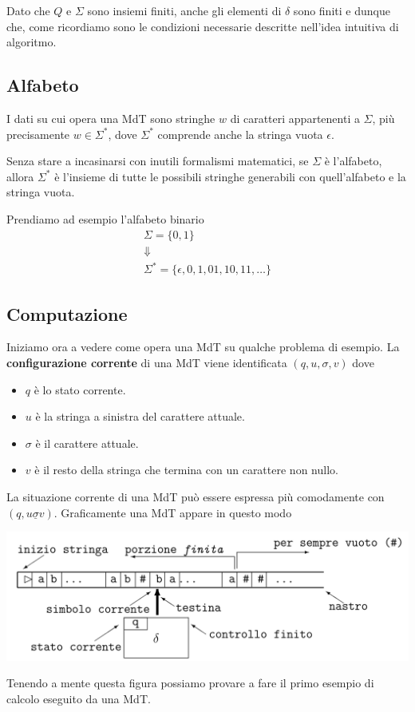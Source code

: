 Dato che $Q$ e $\Sigma$ sono insiemi finiti, anche gli elementi
di $\delta$ sono finiti e dunque che, come ricordiamo sono le
condizioni necessarie descritte nell'idea intuitiva di
algoritmo.


\subsection{Alfabeto}
I dati su cui opera una MdT sono stringhe $w$ di caratteri
appartenenti a $\Sigma$, più precisamente $w \in \Sigma^*$,
dove $\Sigma^*$ comprende anche la stringa vuota $\epsilon$.

Senza stare a incasinarsi con inutili formalismi matematici,
se $\Sigma$ è l'alfabeto, allora $\Sigma^*$ è l'insieme di
tutte le possibili stringhe generabili con quell'alfabeto e
la stringa vuota.

\begin{example}
	Prendiamo ad esempio l'alfabeto binario
	\begin{gather*}
		\Sigma = \{ 0, 1 \} \\
		\Downarrow \\
		\Sigma^* = \{ \epsilon, 0, 1, 01, 10, 11, \dots \}
	\end{gather*}
\end{example}

\subsection{Computazione}
Iniziamo ora a vedere come opera una MdT su qualche problema
di esempio. La \textbf{configurazione corrente} di una MdT
viene identificata $(q, u, \sigma, v)$ dove
\begin{itemize}
	\item $q$ è lo stato corrente.
	\item $u$ è la stringa a sinistra del carattere attuale.
	\item $\sigma$ è il carattere attuale.
	\item $v$ è il resto della stringa che termina con un
	      carattere non nullo.
\end{itemize}
La situazione corrente di una MdT può essere espressa più
comodamente con $(q, u \underline{\sigma} v)$. Graficamente
una MdT appare in questo modo
\begin{center}
	\includegraphics[scale=0.225]{images/turing.png}
\end{center}
Tenendo a mente questa figura possiamo provare a fare il primo
esempio di calcolo eseguito da una MdT.

